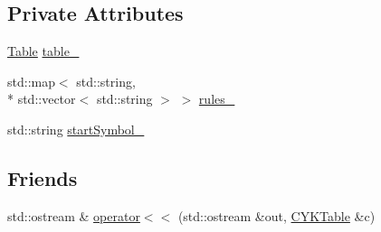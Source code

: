\subsection*{Private Attributes}
\begin{DoxyCompactItemize}
\item 
\hyperlink{CYKTable_8h_a98fc1757708d007972f5f4640a85323e}{Table} \hyperlink{classCYKTable_a847f477bcba128dab98ac8cfa987fd04}{table\-\_\-}
\item 
std\-::map$<$ std\-::string, \\*
std\-::vector$<$ std\-::string $>$ $>$ \hyperlink{classCYKTable_a90179858da18c70ad4338af8661ddc8a}{rules\-\_\-}
\item 
std\-::string \hyperlink{classCYKTable_a789892d83fa60dafe30168633dba22ca}{start\-Symbol\-\_\-}
\end{DoxyCompactItemize}
\subsection*{Friends}
\begin{DoxyCompactItemize}
\item 
std\-::ostream \& \hyperlink{classCYKTable_a000e039ebe267650040107125c5247f2}{operator$<$$<$} (std\-::ostream \&out, \hyperlink{classCYKTable}{C\-Y\-K\-Table} \&c)
\end{DoxyCompactItemize}


